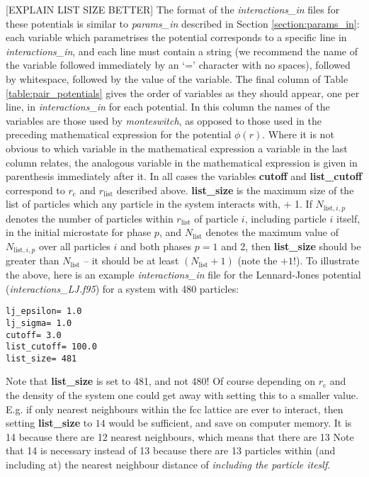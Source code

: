 \documentclass{report}
\begin{document}
[EXPLAIN LIST SIZE BETTER]
The format of the \emph{interactions\_in} files for these potentials is similar to \emph{params\_in} described in Section \ref{section:params_in}:
each variable which parametrises the potential corresponds to a specific line in \emph{interactions\_in}, and each line must contain a string
(we recommend the name of the variable followed immediately by an `=' character with no spaces), followed by whitespace, followed by the value
of the variable. The final column of Table \ref{table:pair_potentials} gives the order of variables as they should appear, one per line, in
\emph{interactions\_in} for each potential. In this column the names of the variables are those used by \emph{monteswitch}, as opposed to those
used in the preceding mathematical expression for the potential $\phi(r)$. Where it is not obvious to which variable in the mathematical expression
a variable in the last column relates, the analogous variable in the mathematical expression is given in parenthesis immediately after it. In all
cases the variables \textbf{cutoff} and \textbf{list\_cutoff} correspond to $r_{\text{c}}$ and $r_{\text{list}}$ described above. \textbf{list\_size} is the
maximum size of the list of particles which any particle in the system interacts with, + 1. If $N_{\text{list},i,p}$ denotes the number of particles within
$r_{\text{list}}$ of particle $i$, including particle $i$ itself,
in the initial microstate for phase $p$, and $N_{\text{list}}$ denotes the maximum value of $N_{\text{list},i,p}$ over all particles
$i$ and both phases $p=1$ and 2, then \textbf{list\_size} should be greater than $N_{\text{list}}$ -- it should be at least $(N_{\text{list}}+1)$ (note the
$+1$!). To illustrate the above, here is an example \emph{interactions\_in} file for the Lennard-Jones potential (\emph{interactions\_LJ.f95}) for
a system with 480 particles:
\begin{verbatim}
lj_epsilon= 1.0
lj_sigma= 1.0
cutoff= 3.0
list_cutoff= 100.0
list_size= 481
\end{verbatim}
Note that \textbf{list\_size} is set to 481, and not 480! Of course depending on $r_{\text{c}}$ and the density of the system one could get away with 
setting this to a smaller value. E.g. if only nearest neighbours within the fcc lattice are ever to interact, then setting \textbf{list\_size} to
$14$ would be sufficient, and save on computer memory. It is 14 because there are 12 nearest neighbours, which means that there are 13 
Note that 14 is necessary instead of 13 because there are 13 particles within (and including at)
the nearest neighbour distance of \emph{including the particle iteslf}.
\end{document}
